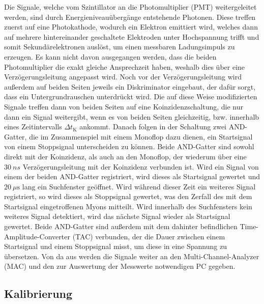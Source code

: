 Die Signale, welche vom Szintillator an die Photomultiplier (PMT) weitergeleitet werden, sind durch Energieniveauübergänge entstehende Photonen. Diese treffen zuerst auf eine Photokathode,
wodurch ein Elektron emittiert wird, welches dann auf mehrere hintereinander geschaltete Elektroden unter Hochspannung trifft und somit Sekundärelektronen auslöst, um einen messbaren
Ladungsimpuls zu erzeugen. Es kann nicht davon ausgegangen werden, dass die beiden Photomultiplier die exakt gleiche Ansprechzeit haben, weshalb dies über eine Verzögerungsleitung 
angepasst wird. Noch vor der Verzögerungsleitung wird außerdem auf beiden Seiten jeweils ein Diskriminator eingebaut, der dafür sorgt, dass ein Untergrundrauschen unterdrückt wird.
Die auf diese Weise modifizierten Signale treffen dann von beiden Seiten auf eine Koinzidenzschaltung, die nur dann ein Signal weitergibt, wenn es von beiden Seiten gleichzeitig,
bzw. innerhalb eines Zeitintervalls $\Delta t_\text{K} $ ankommt. 
Danach folgen in der Schaltung zwei AND-Gatter, die im Zusammenspiel mit einem Monoflop dazu dienen, ein Startsignal von einem Stoppsignal unterscheiden zu können. Beide AND-Gatter
sind sowohl direkt mit der Koinzidenz, als auch an den Monoflop, der wiederum über eine $\SI{30}{ns}$ Verzögerungsleitung mit der Koinzidenz verbunden ist. Wird ein Signal von einem 
der beiden AND-Gatter registriert, wird dieses als Startsignal gewertet und $\SI{20}{\mu\second}$ lang ein Suchfenster geöffnet. Wird während dieser Zeit ein weiteres Signal registriert, so wird dieses 
als Stoppsignal gewertet, was den Zerfall des mit dem Startsignal eingetroffenen Myons mitteilt. Wird innerhalb des Suchfensters kein weiteres Signal detektiert, wird das nächste Signal 
wieder als Startsignal gewertet. Beide AND-Gatter sind außerdem mit 
dem dahinter befindlichen Time-Amplitude-Converter (TAC) verbunden, der die Dauer zwischen einem Startsignal und einem Stoppsignal misst, um diese in eine Spannung zu 
übersetzen. Von da aus werden die Signale weiter an den Multi-Channel-Analyzer (MAC) und den zur Auswertung der Messwerte notwendigen PC gegeben.

\subsection{Kalibrierung}

